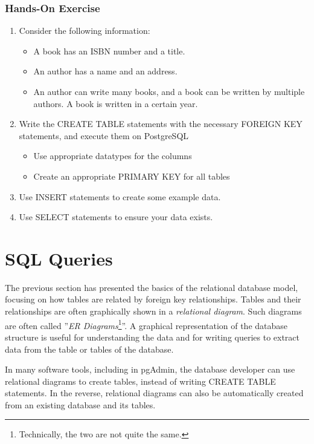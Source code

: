 \begin{tcolorbox}[colback=code]
\subsubsection*{Hands-On Exercise}
\begin{enumerate}
  \item Consider the following information:
	\begin{itemize}
	  \item A book has an ISBN number and a title. 
	  \item An author has a name and an address. 
	  \item An author can write many books, and a book can be written by multiple authors. A book is written in a certain year.
	\end{itemize}
  \item Write the CREATE TABLE statements with the necessary FOREIGN KEY statements, and execute them on PostgreSQL
  \begin{itemize}
    \item Use appropriate datatypes for the columns
    \item Create an appropriate PRIMARY KEY for all tables
  \end{itemize}
  \item Use INSERT statements to create some example data.
  \item Use SELECT statements to ensure your data exists.
\end{enumerate}
\end{tcolorbox}

\section{SQL Queries}

The previous section has presented the basics of the relational database model, focusing on how tables are related by foreign key relationships. Tables and their relationships are often graphically shown in a \emph{relational diagram}. Such diagrams are often called ''\emph{ER Diagrams}\footnote{Technically, the two are not quite the same.}''. A graphical representation of the database structure is useful for understanding the data and for writing queries to extract data from the table or tables of the database. 

In many software tools, including in pgAdmin, the database developer can use relational diagrams to create tables, instead of writing CREATE TABLE statements. In the reverse, relational diagrams can also be automatically created from an existing database and its tables. 

